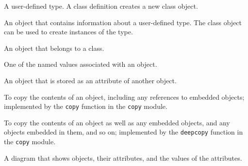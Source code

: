 \begin{vocabulary}[class:] A user-defined type.  A class definition creates a new
class object.
\end{vocabulary}
	
\begin{vocabulary} An object that contains information about a
user-defined type.  The class object can be used to create instances
of the type.
\end{vocabulary}
	
\begin{vocabulary}[instance:] An object that belongs to a class.
\end{vocabulary}
	
\begin{vocabulary}[attribute:] One of the named values associated with an object.
\end{vocabulary}
	
\begin{vocabulary} An object that is stored as an attribute
of another object.
\end{vocabulary}
	
\begin{vocabulary} To copy the contents of an object, including
any references to embedded objects;
implemented by the {\tt copy} function in the {\tt copy} module.
\end{vocabulary}
	
\begin{vocabulary} To copy the contents of an object as well as any
embedded objects, and any objects embedded in them, and so on;
implemented by the {\tt deepcopy} function in the {\tt copy} module.
\end{vocabulary}
	
\begin{vocabulary} A diagram that shows objects, their
attributes, and the values of the attributes.
\end{vocabulary}


